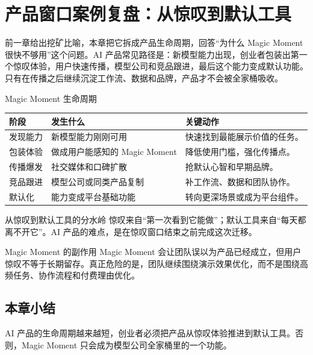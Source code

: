 \section{产品窗口案例复盘：从惊叹到默认工具}

前一章给出挖矿比喻，本章把它拆成产品生命周期，回答“为什么 Magic Moment 很快不够用”这个问题。AI 产品常见路径是：新模型能力出现，创业者包装出第一个惊叹体验，用户快速传播，模型公司和竞品跟进，最后这个能力变成默认功能。只有在传播之后继续沉淀工作流、数据和品牌，产品才不会被全家桶吸收。

\begin{knowledgebox}{Magic Moment 生命周期}
\begin{tabularx}{\textwidth}{p{}p{}X}
\toprule
阶段 & 发生什么 & 关键动作 \\
\midrule
发现能力 & 新模型能力刚刚可用 & 快速找到最能展示价值的任务。 \\
包装体验 & 做成用户能感知的 Magic Moment & 降低使用门槛，强化传播点。 \\
传播爆发 & 社交媒体和口碑扩散 & 抢默认心智和早期品牌。 \\
竞品跟进 & 模型公司或同类产品复制 & 补工作流、数据和团队协作。 \\
默认化 & 能力变成平台基础功能 & 转向更深场景或成为平台组件。 \\
\bottomrule
\end{tabularx}
\end{knowledgebox}

\begin{importantbox}{从惊叹到默认工具的分水岭}
惊叹来自“第一次看到它能做”；默认工具来自“每天都离不开它”。AI 产品的难点，是在惊叹窗口结束之前完成这次迁移。
\end{importantbox}

\begin{warningbox}{Magic Moment 的副作用}
Magic Moment 会让团队误以为产品已经成立，但用户惊叹不等于长期留存。真正危险的是，团队继续围绕演示效果优化，而不是围绕高频任务、协作流程和付费理由优化。
\end{warningbox}

\subsection{本章小结}

AI 产品的生命周期越来越短，创业者必须把产品从惊叹体验推进到默认工具。否则，Magic Moment 只会成为模型公司全家桶里的一个功能。

